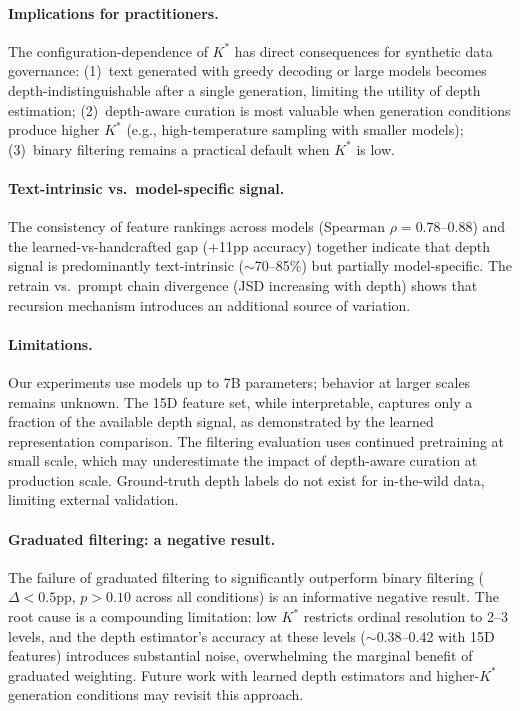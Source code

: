 \documentclass[11pt]{article}
\begin{document}
\paragraph{Implications for practitioners.}
The configuration-dependence of $K^*$ has direct consequences for synthetic data governance: (1)~text generated with greedy decoding or large models becomes depth-indistinguishable after a single generation, limiting the utility of depth estimation; (2)~depth-aware curation is most valuable when generation conditions produce higher $K^*$ (e.g., high-temperature sampling with smaller models); (3)~binary filtering remains a practical default when $K^*$ is low.

\paragraph{Text-intrinsic vs.\ model-specific signal.}
The consistency of feature rankings across models (Spearman $\rho = 0.78$--$0.88$) and the learned-vs-handcrafted gap (+11pp accuracy) together indicate that depth signal is predominantly text-intrinsic ($\sim$70--85\%) but partially model-specific. The retrain vs.\ prompt chain divergence (JSD increasing with depth) shows that recursion mechanism introduces an additional source of variation.

\paragraph{Limitations.}
Our experiments use models up to 7B parameters; behavior at larger scales remains unknown. The 15D feature set, while interpretable, captures only a fraction of the available depth signal, as demonstrated by the learned representation comparison. The filtering evaluation uses continued pretraining at small scale, which may underestimate the impact of depth-aware curation at production scale. Ground-truth depth labels do not exist for in-the-wild data, limiting external validation.

\paragraph{Graduated filtering: a negative result.}
The failure of graduated filtering to significantly outperform binary filtering ($\Delta < 0.5$pp, $p > 0.10$ across all conditions) is an informative negative result. The root cause is a compounding limitation: low $K^*$ restricts ordinal resolution to 2--3 levels, and the depth estimator's accuracy at these levels ($\sim$0.38--0.42 with 15D features) introduces substantial noise, overwhelming the marginal benefit of graduated weighting. Future work with learned depth estimators and higher-$K^*$ generation conditions may revisit this approach.
\end{document}
